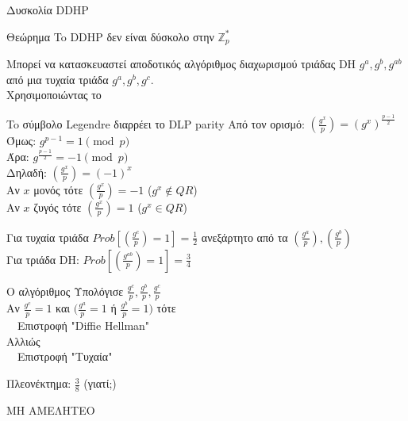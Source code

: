 \documentclass[handout]{beamer}
\begin{document}
\begin{frame}[allowframebreaks]{Δυσκολία DDHP}
\begin{small}
\begin{block}{Θεώρημα}
To DDHP δεν είναι δύσκολο στην $\mathbb{Z}_p^*$
\end{block}
\pause
Μπορεί να κατασκευαστεί αποδοτικός αλγόριθμος διαχωρισμού τριάδας DH $g^a,g^b,g^{ab}$ από μια τυχαία τριάδα $g^a,g^b,g^c$.\\
\pause
{} Χρησιμοποιώντας το 
\pause
\begin{block}{To σύμβολο Legendre διαρρέει το DLP parity}
Από τον ορισμό: 
$(\frac{g^{x}}{p}) = (g^{x})^{\frac{p-1}{2}}$ \\
Όμως:
$g^{p-1} = 1 \pmod{p}$ \\
Άρα: 
$g^\frac{p-1}{2} = -1 \pmod{p}$ \\
Δηλαδή:
$(\frac{g^{x}}{p}) = (-1)^x$ \\
Αν $x$ μονός  τότε $(\frac{g^{x}}{p}) = -1$ ($g^x \not\in QR$)\\
Αν $x$ ζυγός  τότε $(\frac{g^{x}}{p}) = 1$  ($g^x \in QR$)
\end{block}
\pause
Για τυχαία τριάδα $Prob[(\frac{g^{c}}{p}) = 1] = \frac{1}{2}$ ανεξάρτητο από τα $(\frac{g^{a}}{p}),(\frac{g^{b}}{p})$\\
\pause
Για τριάδα DH: $Prob[(\frac{g^{ab}}{p}) = 1] = \frac{3}{4}$
\pause
\begin{block}{Ο αλγόριθμος}
Υπολόγισε $\frac{g^{c}}{p},\frac{g^{b}}{p},\frac{g^{c}}{p}$ \\
Αν $\frac{g^{c}}{p} = 1$ και $(\frac{g^{a}}{p} =1$  ή $\frac{g^{b}}{p} = 1)$ τότε \\
 $\>$$\>$$\>$  Επιστροφή "Diffie Hellman" \\
Αλλιώς \\
  $\>$$\>$$\>$ Επιστροφή "Τυχαία" \\
\end{block}
Πλεονέκτημα: $\frac{3}{8}$ (γιατί;) \\
\end{small}
\alert{ΜΗ ΑΜΕΛΗΤΕΟ}\\

\end{frame}
\end{document}
